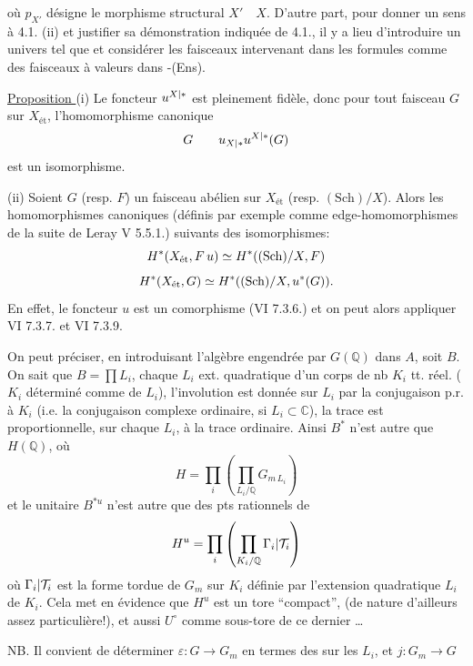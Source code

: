
où $p_{X'}$ désigne le morphisme structural $X'\quad X$.
D'autre part, pour donner un sens à 4.1. (ii) et justifier sa démonstration
indiquée de 4.1., il y a lieu d'introduire un univers \quad tel que \quad
\unsure{,}
et considérer les faisceaux intervenant dans les formules 
comme des faisceaux à valeurs dans \quad -(Ens).

\uline{Proposition } (i) Le foncteur
$u^{X|*}$ est pleinement fidèle, donc pour tout faisceau $G$
sur $X_{\text{ét}}$, l'homomorphisme canonique
\[
G\qquad u_{X|*}u^{X|*}(G)
\]
est un isomorphisme.

(ii) Soient $G$ (resp. $F$) un faisceau abélien sur $X_{\text{ét}}$
(resp. $(\mathrm{Sch})/X$).
Alors les homomorphismes canoniques (définis par exemple comme
edge-homomorphismes de la suite  de Leray V 5.5.1.)
suivants  des isomorphismes:
\[
H^{*}(X_{\text{ét}},F\,u)\simeq
H^{*}((\mathrm{Sch})/X,F)
\]
\[
H^*(X_{\text{ét}},G)\simeq
H^{*}((\mathrm{Sch})/X,u^{*}(G)).
\]
En effet, le foncteur $u$ est un comorphisme (VI 7.3.6.) et on peut alors
appliquer VI 7.3.7. et VI 7.3.9.


On peut préciser, en introduisant l'algèbre engendrée par
 $G(\mathbb Q)$ dans $A$, soit $B$.
On sait que $B=\prod L_i$, chaque $L_i$ ext. quadratique d'un corps
de nb $K_i$ tt. réel.
($K_i$ déterminé 
comme  de $L_i$),
l'involution est donnée sur $L_i$ par la conjugaison p.r. à $K_i$
(i.e. la conjugaison complexe ordinaire, si $L_i\subset\mathbb C$),
la trace est proportionnelle, sur chaque $L_i$, à la trace ordinaire.
Ainsi $B^*$ n'est autre que $H(\mathbb Q)$, où
\[
H=\prod_i\left(\prod_{L_i/\mathbb Q}G_{m\,L_i}\right)
\]
et le  unitaire $B^{*u}$ n'est autre que   des pts rationnels de
\[
H^u=\prod_i\left(\prod_{K_i/\mathbb Q}\Gamma_i|\mathcal T_i\right)
\]
où $\Gamma_i|\mathcal T_i$ est la forme tordue de $G_m$ sur $K_i$
définie par l'extension quadratique $L_i$ de $K_i$.
\deleted{[}
Cela met en évidence que $H^u$ est un tore ``compact'',
(de nature d'ailleurs assez particulière!), et aussi $U^\circ$ comme
sous-tore de ce dernier \ldots

NB. Il convient de déterminer $\varepsilon:G\longrightarrow G_m$
en termes des  sur les $L_i$, et
$j:G_m\longrightarrow G$ 
